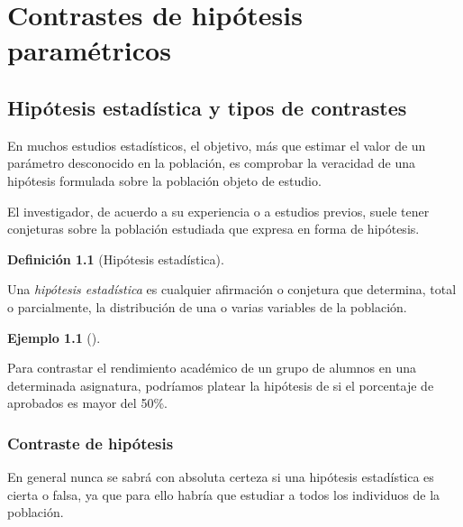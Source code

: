 \documentclass[
  spanish,
  a4paper,
]{scrreport}
\theoremstyle{plain}
\theoremstyle{definition}
\newtheorem{example}{Ejemplo}[chapter]
\theoremstyle{definition}
\newtheorem{definition}{Definición}[chapter]
\theoremstyle{remark}
\begin{document}

\chapter{Contrastes de hipótesis
paramétricos}\label{contrastes-de-hipuxf3tesis-paramuxe9tricos}

\section{Hipótesis estadística y tipos de
contrastes}\label{hipuxf3tesis-estaduxedstica-y-tipos-de-contrastes}

En muchos estudios estadísticos, el objetivo, más que estimar el valor
de un parámetro desconocido en la población, es comprobar la veracidad
de una hipótesis formulada sobre la población objeto de estudio.

El investigador, de acuerdo a su experiencia o a estudios previos, suele
tener conjeturas sobre la población estudiada que expresa en forma de
hipótesis.

\begin{definition}[Hipótesis
estadística]\protect\hypertarget{def-hipotesis-estadistica}{}\label{def-hipotesis-estadistica}

Una \emph{hipótesis estadística} es cualquier afirmación o conjetura que
determina, total o parcialmente, la distribución de una o varias
variables de la población.

\end{definition}

\begin{example}[]\protect\hypertarget{exm-hipotesis-estadistica}{}\label{exm-hipotesis-estadistica}

Para contrastar el rendimiento académico de un grupo de alumnos en una
determinada asignatura, podríamos platear la hipótesis de si el
porcentaje de aprobados es mayor del 50\%.

\end{example}

\subsection{Contraste de hipótesis}\label{contraste-de-hipuxf3tesis}

En general nunca se sabrá con absoluta certeza si una hipótesis
estadística es cierta o falsa, ya que para ello habría que estudiar a
todos los individuos de la población.
\end{document}
